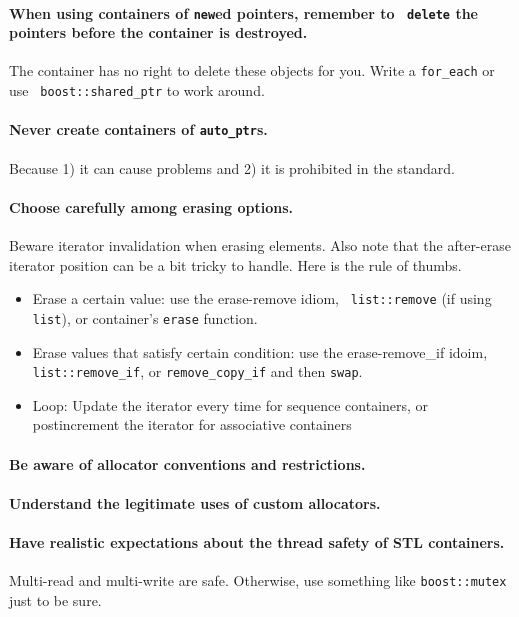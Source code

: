 \documentclass{article}
\begin{document}
\paragraph{When using containers of {\tt new}ed pointers, remember to {\tt
delete} the pointers before the container is destroyed.}  The container has no
right to delete these objects for you.  Write a {\tt for\_each} or use {\tt
boost::shared\_ptr} to work around.

\paragraph{Never create containers of {\tt auto\_ptr}s.}  Because 1) it can
cause problems and 2) it is prohibited in the standard.

\paragraph{Choose carefully among erasing options.} Beware iterator
invalidation when erasing elements.  Also note that the after-erase iterator
position can be a bit tricky to handle.  Here is the rule of thumbs.

\begin{itemize} \item Erase a certain value: use the erase-remove idiom, {\tt
list::remove} (if using {\tt list}), or container's {\tt erase} function.
\item Erase values that satisfy certain condition: use the erase-remove\_if idoim, {\tt
list::remove\_if}, or {\tt remove\_copy\_if} and then {\tt swap}.  \item Loop:
Update the iterator every time for sequence containers, or postincrement the
iterator for associative containers \end{itemize}

\paragraph{Be aware of allocator conventions and restrictions.}

\paragraph{Understand the legitimate uses of custom allocators.}

\paragraph{Have realistic expectations about the thread safety of STL
containers.}  Multi-read and multi-write are safe.  Otherwise, use something
like {\tt boost::mutex} just to be sure.
\end{document}
